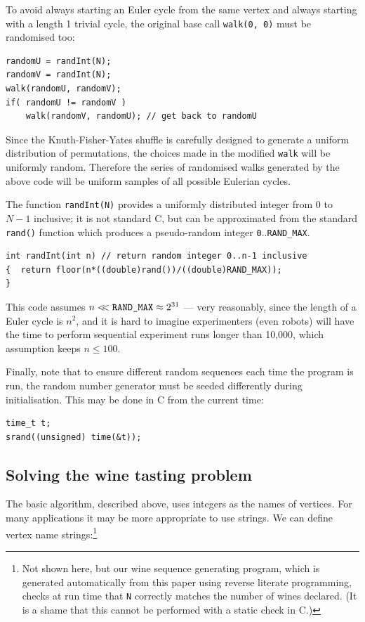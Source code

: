 \documentclass[prodmode,acmtecs]{acmsmall} %
\begin{document}
To avoid always starting an Euler cycle from the same vertex and always starting with a length 1 trivial cycle, the original base call \texttt{walk(0, 0)} must be randomised too:

\begin{verbatim}
randomU = randInt(N);
randomV = randInt(N);
walk(randomU, randomV); 
if( randomU != randomV )
    walk(randomV, randomU); // get back to randomU
\end{verbatim}

Since the Knuth-Fisher-Yates shuffle is carefully designed to generate a uniform distribution of permutations, the choices made in the modified \texttt{walk} will be uniformly random. Therefore the series of randomised walks generated by the above code will be uniform samples of all possible Eulerian cycles.

The function \texttt{randInt(N)} provides a uniformly distributed integer from $0$ to $N-1$ inclusive; it is not standard C, but can be approximated from the standard \texttt{rand()} function which produces a pseudo-random integer \texttt{0}..\texttt{RAND\_MAX}. 

\begin{verbatim}
int randInt(int n) // return random integer 0..n-1 inclusive
{  return floor(n*((double)rand())/((double)RAND_MAX));
}
\end{verbatim}

This code assumes $n<\!\!<\mbox{\tt RAND\_MAX}\approx 2^{31}$ \cite[p119]{knuth2} --- very reasonably, since the length of a Euler cycle is $n^2$, and it is hard to imagine experimenters (even robots) will have the time to perform sequential experiment runs longer than 10,000, which assumption keeps $n\leq100$. 

Finally, note that to ensure different random sequences each time the program is run, the random number generator must be seeded differently during initialisation. This may be done in C from the current time:

\begin{verbatim}
time_t t;
srand((unsigned) time(&t)); 
\end{verbatim}

\subsection{Solving the wine tasting problem}\label{winetasting}
The basic algorithm, described above, uses integers as the names of vertices. For many applications it may be more appropriate to use strings. We can define vertex name strings:\footnote{Not shown here, but our wine sequence generating program, which is generated automatically from this paper using reverse literate programming, checks at run time that \texttt{N} correctly matches the number of wines declared. (It is a shame that this cannot be performed with a static check in C.)}
\end{document}

